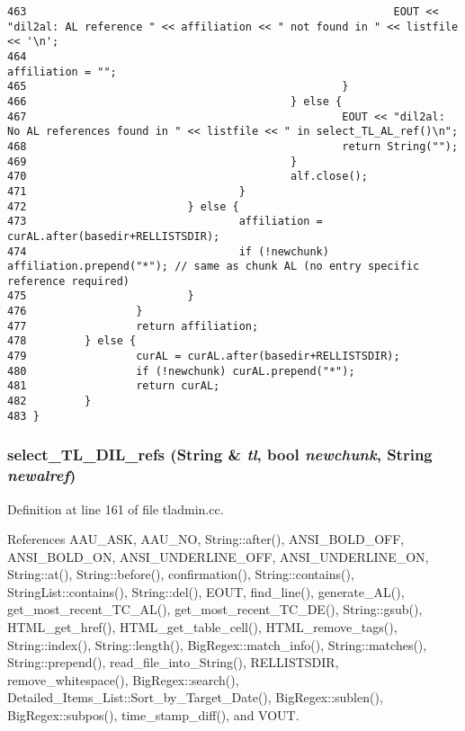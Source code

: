 \begin{verbatim}
463                                                         EOUT << "dil2al: AL reference " << affiliation << " not found in " << listfile << '\n';
464                                                         affiliation = "";
465                                                 }
466                                         } else {
467                                                 EOUT << "dil2al: No AL references found in " << listfile << " in select_TL_AL_ref()\n";
468                                                 return String("");
469                                         }
470                                         alf.close();
471                                 }
472                         } else {
473                                 affiliation = curAL.after(basedir+RELLISTSDIR);
474                                 if (!newchunk) affiliation.prepend("*"); // same as chunk AL (no entry specific reference required)
475                         }
476                 }
477                 return affiliation;
478         } else {
479                 curAL = curAL.after(basedir+RELLISTSDIR);
480                 if (!newchunk) curAL.prepend("*");
481                 return curAL;
482         }
483 }
\end{verbatim}\normalsize 
{}
\subsubsection{ select\_\-TL\_\-DIL\_\-refs ({\bf String} \& {\em tl}, bool {\em newchunk}, {\bf String} {\em newalref})}\label{dil2al_8hh_a323}




Definition at line 161 of file tladmin.cc.

References AAU\_\-ASK, AAU\_\-NO, String::after(), ANSI\_\-BOLD\_\-OFF, ANSI\_\-BOLD\_\-ON, ANSI\_\-UNDERLINE\_\-OFF, ANSI\_\-UNDERLINE\_\-ON, String::at(), String::before(), confirmation(), String::contains(), String\-List::contains(), String::del(), EOUT, find\_\-line(), generate\_\-AL(), get\_\-most\_\-recent\_\-TC\_\-AL(), get\_\-most\_\-recent\_\-TC\_\-DE(), String::gsub(), HTML\_\-get\_\-href(), HTML\_\-get\_\-table\_\-cell(), HTML\_\-remove\_\-tags(), String::index(), String::length(), Big\-Regex::match\_\-info(), String::matches(), String::prepend(), read\_\-file\_\-into\_\-String(), RELLISTSDIR, remove\_\-whitespace(), Big\-Regex::search(), Detailed\_\-Items\_\-List::Sort\_\-by\_\-Target\_\-Date(), Big\-Regex::sublen(), Big\-Regex::subpos(), time\_\-stamp\_\-diff(), and VOUT.

